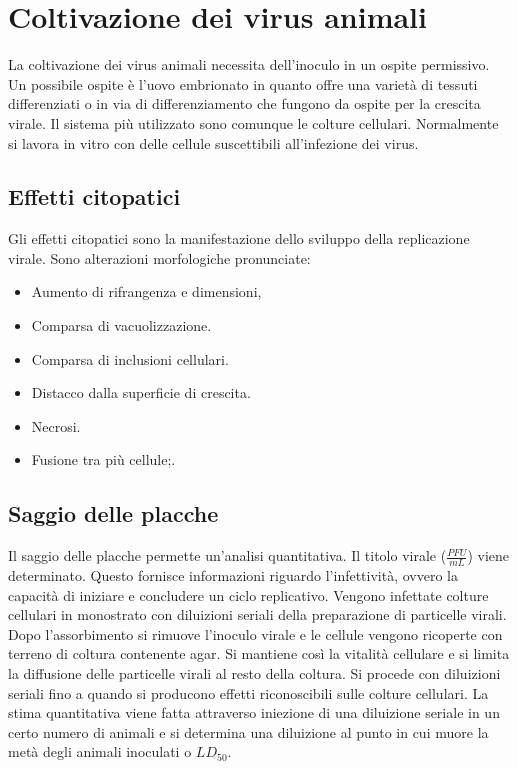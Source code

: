 \section{Coltivazione dei virus animali}
La coltivazione dei virus animali necessita dell'inoculo in un ospite permissivo. 
Un possibile ospite \`e l'uovo embrionato in quanto offre una varietà di tessuti differenziati o in via di differenziamento che fungono da ospite per la crescita virale.
Il sistema pi\`u utilizzato sono comunque le colture cellulari.
Normalmente si lavora in vitro con delle cellule suscettibili all'infezione dei virus. 

	\subsection{Effetti citopatici}
	Gli effetti citopatici sono la manifestazione dello sviluppo della replicazione virale.
	Sono alterazioni morfologiche pronunciate:
	\begin{multicols}{2}
		\begin{itemize}
    			\item Aumento di rifrangenza e dimensioni,
    			\item Comparsa di vacuolizzazione.
    			\item Comparsa di inclusioni cellulari. 
    			\item Distacco dalla superficie di crescita.
    			\item Necrosi.
    			\item Fusione tra più cellule;.
		\end{itemize}
	\end{multicols}

	\subsection{Saggio delle placche}
	Il saggio delle placche permette un'analisi quantitativa.
	Il titolo virale ($\frac{PFU}{\si{mL}}$) viene determinato.
	Questo fornisce informazioni riguardo l'infettivit\`a, ovvero la capacit\`a di iniziare e concludere un ciclo replicativo.
	Vengono infettate colture cellulari in monostrato con diluizioni seriali della preparazione di particelle virali.
	Dopo l'assorbimento si rimuove l'inoculo virale e le cellule vengono ricoperte con terreno di coltura contenente agar.
	Si mantiene cos\`i la vitalit\`a cellulare e si limita la diffusione delle particelle virali al resto della coltura.
	Si procede con diluizioni seriali fino a quando si producono effetti riconoscibili sulle colture cellulari.
	La stima quantitativa viene fatta attraverso iniezione di una diluizione seriale in un certo numero di animali e si determina una diluizione al punto in cui muore la met\`a degli animali inoculati o $LD_{50}$.

